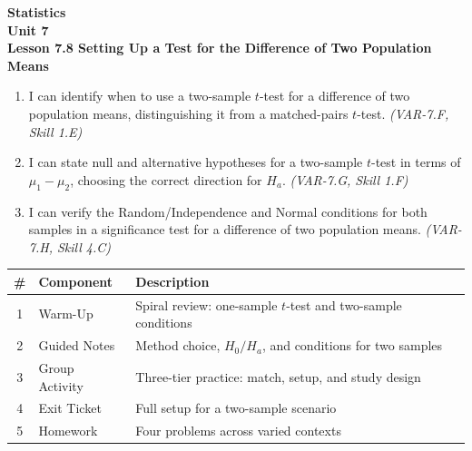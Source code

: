 \documentclass[10pt]{article}
\begin{document}
\vspace{-0.8in}

\begin{center}
  {\color{white}\textbf{\LARGE Statistics}}\\[4pt]
  {\color{skymid}\large\textbf{Unit 7}}\\[6pt]
  {\color{white}\textbf{\large Lesson 7.8 \quad Setting Up a Test for the Difference of Two Population Means}}
\end{center}

\vspace{0.22in}
\namedateperiod
\vspace{0.18in}

\begin{learningtargetbox}
\small
\begin{enumerate}[leftmargin=1.5em, itemsep=5pt]
  \item I can identify when to use a two-sample $t$-test for a difference of two
        population means, distinguishing it from a matched-pairs $t$-test.
        \textit{(VAR-7.F, Skill 1.E)}
  \item I can state null and alternative hypotheses for a two-sample $t$-test in
        terms of $\mu_1 - \mu_2$, choosing the correct direction for $H_a$.
        \textit{(VAR-7.G, Skill 1.F)}
  \item I can verify the Random/Independence and Normal conditions for both samples
        in a significance test for a difference of two population means.
        \textit{(VAR-7.H, Skill 4.C)}
\end{enumerate}
\end{learningtargetbox}

\vspace{0.14in}

\begin{tocbox}
\small
\renewcommand{\arraystretch}{1.5}
\begin{tabularx}{\linewidth}{@{} c l X @{}}
\rowcolor{sky}
\textbf{\#} & \textbf{Component} & \textbf{Description} \\
\midrule
1 & Warm-Up        & Spiral review: one-sample $t$-test and two-sample conditions \\
2 & Guided Notes   & Method choice, $H_0/H_a$, and conditions for two samples \\
3 & Group Activity & Three-tier practice: match, setup, and study design \\
4 & Exit Ticket    & Full setup for a two-sample scenario \\
5 & Homework       & Four problems across varied contexts \\
\end{tabularx}
\end{tocbox}
\end{document}
